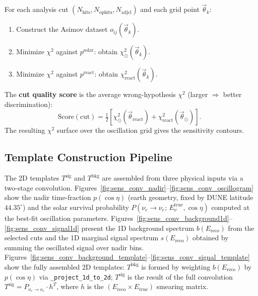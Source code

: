 \documentclass[12pt,a4paper]{article}
\newcommand{\oij}{o_{ij}}
\begin{document}
For each analysis cut $(N_{\mathrm{hits}},N_{\mathrm{ophits}},N_{\mathrm{adjcl}})$
and each grid point $\vec{\theta}_k$:
\begin{enumerate}[leftmargin=*]
  \item Construct the Asimov dataset $\oij(\vec{\theta}_k)$.
  \item Minimize $\chi^2$ against $p^{\mathrm{solar}}$:
    obtain $\chi^2_\odot(\vec{\theta}_k)$.
  \item Minimize $\chi^2$ against $p^{\mathrm{react}}$:
    obtain $\chi^2_{\mathrm{react}}(\vec{\theta}_k)$.
\end{enumerate}

The \textbf{cut quality score} is the average wrong-hypothesis $\chi^2$
(larger $\Rightarrow$ better discrimination):
\begin{equation}
  \mathrm{Score}(\mathrm{cut}) =
    \tfrac{1}{2}\!\left[
      \chi^2_\odot(\vec{\theta}_{\mathrm{react}})
      + \chi^2_{\mathrm{react}}(\vec{\theta}_\odot)
    \right].
  \label{eq:sens_score}
\end{equation}
The resulting $\chi^2$ surface over the oscillation grid gives the
sensitivity contours.

\subsection{Template Construction Pipeline}
\label{sec:sens_pipeline}

The 2D templates $T^{\mathrm{sig}}$ and $T^{\mathrm{bkg}}$ are assembled
from three physical inputs via a two-stage convolution.
Figures~\ref{fig:sens_conv_nadir}--\ref{fig:sens_conv_oscillogram} show the
nadir time-fraction $p(\cos\eta)$ (earth geometry, fixed by DUNE latitude
$44.35^\circ$) and the solar survival probability
$P(\nu_e\!\to\!\nu_e;\,E_\nu^{\mathrm{true}},\cos\eta)$ computed at the
best-fit oscillation parameters.
Figures~\ref{fig:sens_conv_background1d}--\ref{fig:sens_conv_signal1d}
present the 1D background spectrum $b(E_{\mathrm{reco}})$ from the selected
cuts and the 1D marginal signal spectrum $s(E_{\mathrm{reco}})$ obtained by
summing the oscillated signal over nadir bins.
Figures~\ref{fig:sens_conv_background_template}--\ref{fig:sens_conv_signal_template}
show the fully assembled 2D templates:
$T^{\mathrm{bkg}}$ is formed by weighting $b(E_{\mathrm{reco}})$ by
$p(\cos\eta)$ via \texttt{\_project\_1d\_to\_2d};
$T^{\mathrm{sig}}$ is the result of the full convolution
$T^{\mathrm{sig}} = P_{\nu_e\to\nu_e}\cdot h^T$,
where $h$ is the $(E_{\mathrm{reco}}\times E_{\mathrm{true}})$ smearing matrix.
\end{document}
